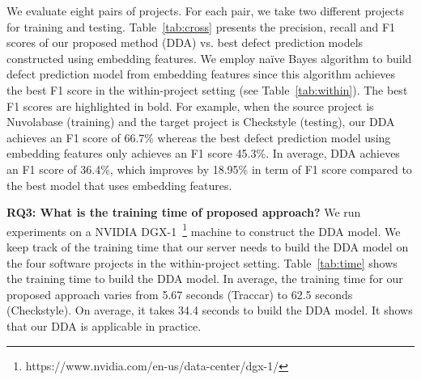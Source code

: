 We evaluate eight pairs of projects. For each pair, we take two different projects for training and testing. Table~\ref{tab:cross} presents the precision, recall and F1 scores of our proposed method (DDA) vs. best defect prediction models constructed using embedding features. We employ na\"{i}ve Bayes algorithm to build defect prediction model from embedding features since this algorithm achieves the best F1 score in the within-project setting (see Table~\ref{tab:within}). The best F1 scores are highlighted in bold. For example, when the source project is Nuvolabase (training) and the target project is Checkstyle (testing), our DDA achieves an F1 score of 66.7\% whereas the best defect prediction model using embedding features only achieves an F1 score 45.3\%. In average, DDA achieves an F1 score of 36.4\%, which improves by 18.95\% in term of F1 score compared to the best model that uses embedding features. 

\textbf{RQ3: What is the training time of proposed approach?}
We run experiments on a NVIDIA DGX-1~\footnote{https://www.nvidia.com/en-us/data-center/dgx-1/} machine to construct the DDA model. We keep track of the training time that our server needs to build the DDA model on the four software projects in the within-project setting. Table~\ref{tab:time} shows the training time to build the DDA model. In average, the training time for our proposed approach varies from 5.67 seconds (Traccar) to 62.5 seconds (Checkstyle). On average, it takes 34.4 seconds to build the DDA model. It shows that our DDA is applicable in practice.


